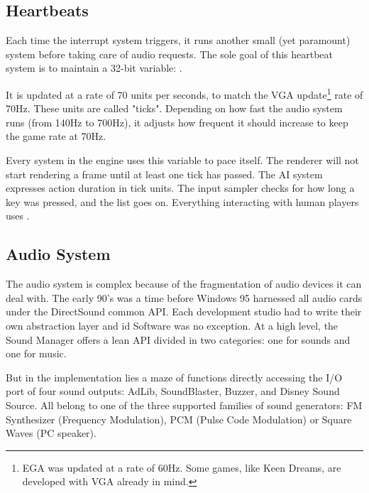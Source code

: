 \documentclass[book.tex]{subfiles}
\begin{document}
\subsection{Heartbeats}
Each time the interrupt system triggers, it runs another small (yet paramount) system before taking care of audio requests. The sole goal of this heartbeat system is to maintain a 32-bit variable: .\\
\par
\begin{minipage}{\textwidth}

\end{minipage}
\par
It is updated at a rate of 70 units per seconds, to match the VGA update\footnote{EGA was updated at a rate of 60Hz. Some games, like Keen Dreams, are developed with VGA already in mind.} rate of 70Hz. These units are called "ticks". Depending on how fast the audio system runs (from 140Hz to 700Hz), it adjusts how frequent it should increase  to keep the game rate at 70Hz.\\
\par
Every system in the engine uses this variable to pace itself. The renderer will not start rendering a frame until at least one tick has passed. The AI system expresses action duration in tick units. The input sampler checks for how long a key was pressed, and the list goes on. Everything interacting with human players uses .\\


\subsection{Audio System}
The audio system is complex because of the fragmentation of audio devices it can deal with. The early 90's was a time before Windows 95 harnessed all audio cards under the DirectSound common API. Each development studio had to write their own abstraction layer and id Software was no exception. At a high level, the Sound Manager offers a lean API divided in two categories: one for sounds and one for music.\\
\par
\begin{minipage}{\textwidth}

\end{minipage}
\par
\begin{minipage}{\textwidth}

\end{minipage}
\par
\vspace{10pt}
But in the implementation lies a maze of functions directly accessing the I/O port of four sound outputs: AdLib, SoundBlaster, Buzzer, and Disney Sound Source. All belong to one of the three supported families of sound generators: FM Synthesizer (Frequency Modulation), PCM (Pulse Code Modulation) or Square Waves (PC speaker).\\
\par
\end{document}
